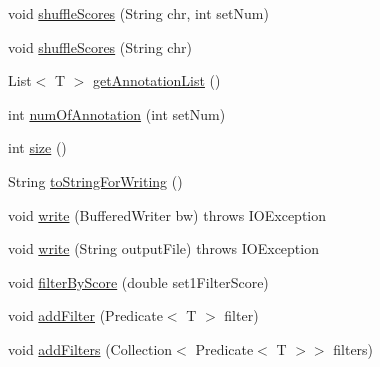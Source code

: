 \begin{DoxyCompactItemize}
\item 
void \hyperlink{classbroad_1_1core_1_1annotation_1_1_annotation_reader_3_01_t_01extends_01_genomic_annotation_01_4_ad5eff9559e77539463640515315cd0d0}{shuffle\+Scores} (String chr, int set\+Num)
\item 
void \hyperlink{classbroad_1_1core_1_1annotation_1_1_annotation_reader_3_01_t_01extends_01_genomic_annotation_01_4_ac3f633f85ce2f7edb7df80409f985ff5}{shuffle\+Scores} (String chr)
\item 
List$<$ T $>$ \hyperlink{classbroad_1_1core_1_1annotation_1_1_annotation_reader_3_01_t_01extends_01_genomic_annotation_01_4_a0da097cf3604e5b7fee57c820fd91b72}{get\+Annotation\+List} ()
\item 
int \hyperlink{classbroad_1_1core_1_1annotation_1_1_annotation_reader_3_01_t_01extends_01_genomic_annotation_01_4_ac2fcf2953f940bdd0e25b69917571607}{num\+Of\+Annotation} (int set\+Num)
\item 
int \hyperlink{classbroad_1_1core_1_1annotation_1_1_annotation_reader_3_01_t_01extends_01_genomic_annotation_01_4_addf403e222089681708bbb882411e8ce}{size} ()
\item 
String \hyperlink{classbroad_1_1core_1_1annotation_1_1_annotation_reader_3_01_t_01extends_01_genomic_annotation_01_4_abf700452cc2b2b8438d9bcfab675f577}{to\+String\+For\+Writing} ()
\item 
void \hyperlink{classbroad_1_1core_1_1annotation_1_1_annotation_reader_3_01_t_01extends_01_genomic_annotation_01_4_a006d582337e486d4902130b105dfb383}{write} (Buffered\+Writer bw)  throws I\+O\+Exception 
\item 
void \hyperlink{classbroad_1_1core_1_1annotation_1_1_annotation_reader_3_01_t_01extends_01_genomic_annotation_01_4_aeebcaadb72c9549547a1ea9647737655}{write} (String output\+File)  throws I\+O\+Exception 
\item 
void \hyperlink{classbroad_1_1core_1_1annotation_1_1_annotation_reader_3_01_t_01extends_01_genomic_annotation_01_4_a9a81d4b8282f93061474ddb77331f866}{filter\+By\+Score} (double set1\+Filter\+Score)
\item 
void \hyperlink{classbroad_1_1core_1_1annotation_1_1_annotation_reader_3_01_t_01extends_01_genomic_annotation_01_4_a97e6416b0c2076ee68447ea25f9515b2}{add\+Filter} (Predicate$<$ T $>$ filter)
\item 
void \hyperlink{classbroad_1_1core_1_1annotation_1_1_annotation_reader_3_01_t_01extends_01_genomic_annotation_01_4_a495849fd664a76949b664470482b6ba3}{add\+Filters} (Collection$<$ Predicate$<$ T $>$$>$ filters)
\end{DoxyCompactItemize}
